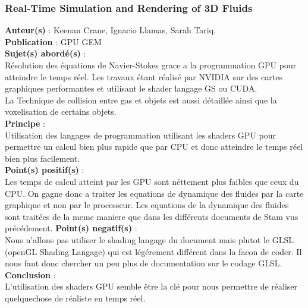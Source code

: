 \documentclass[a4paper,10pt]{article}
\begin{document}
\subsubsection{Real-Time Simulation and Rendering of 3D Fluids}
\textbf{Auteur(s)} : Keenan Crane, Ignacio Llamas, Sarah Tariq.\\
\textbf{Publication} : GPU GEM \\
\textbf{Sujet(s) abordé(s)} : \\ 
	Résolution des équations de Navier-Stokes grace a la programmation GPU pour atteindre le temps réel. Les travaux étant réalisé par NVIDIA sur des cartes graphiques performantes et utilisant le shader langage GS ou CUDA.\\
	La Technique de collision entre gas et objets est aussi détaillée ainsi que la voxelisation de certains objets.\\
\textbf{Principe} :\\	
	Utilisation des langages de programmation utilisant les shaders GPU pour permettre un calcul bien plus rapide que par CPU et donc atteindre le temps réel bien plus facilement.\\
\textbf{Point(s) positif(s)} :\\
	Les temps de calcul atteint par les GPU sont néttement plus faibles que ceux du CPU. On gagne donc a traiter les equations de dynamique des fluides par la carte graphique et non par le processeur. Les equations de la dynamique des fluides sont traitées de la meme maniere que dans les différents documents de Stam vus précédement.
\textbf{Point(s) negatif(s)} :\\
	Nous n'allons pas utiliser le shading langage du document mais plutot le GLSL (openGL Shading Langage) qui est légérement différent dans la facon de coder. Il nous faut donc chercher un peu plus de documentation sur le codage GLSL.\\
\textbf{Conclusion} :\\
	L'utilisation des shaders GPU semble être la clé pour nous permettre de réaliser quelquechose de réaliste en temps réel.\\
\end{document}
